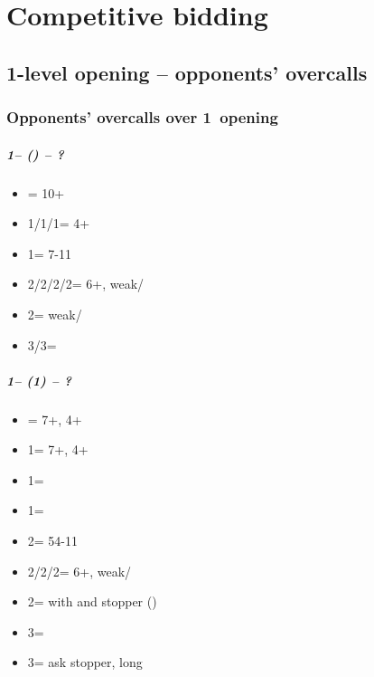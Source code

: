 \documentclass[12pt, a4paper]{report}
\begin{document}
\part*{\colorbox{RoyalPurple!30}{Competitive bidding}}
 {

    \chapter*{\colorbox{Plum!30}{1-level opening -- opponents' overcalls}}
     {

        \section*{\colorbox{blue!30}{Opponents' overcalls over 1\clubs\ opening}}
         {

            \subsubsection*{1\clubs -- (\dbl) -- ?}
            \begin{itemize}
                \item \rdbl = 10+
                \item 1\diams/1\hearts/1\spades = \trsf{\hearts/\spades/\nt} 4+
                \item 1\nt = 7-11
                \item 2\clubs/2\diams/2\hearts/2\spades = \trsf{\diams/\hearts/\spades/\clubs} 6+, weak/\gf
                \item 2\nt = \minor weak/\gf
                \item 3\clubs/3\diams = \inv
            \end{itemize}

            \subsubsection*{1\clubs -- (1\diams) -- ?}
            \begin{itemize}
                \item \dbl = 7+, 4+\hearts
                \item 1\hearts = 7+, 4+\spades
                \item 1\spades = \nt
                \item 1\nt = \inv
                \item 2\clubs = 54-11
                \item 2\diams/2\hearts/2\spades = \trsf{\hearts/\spades/\clubs} 6+, weak/\gf
                \item 2\nt = \inv with \clubs and \diams stopper (\fton{3\clubs})
                \item 3\clubs = \inv
                \item 3\diams = ask stopper, long \clubs
            \end{itemize}

}}}
\end{document}
